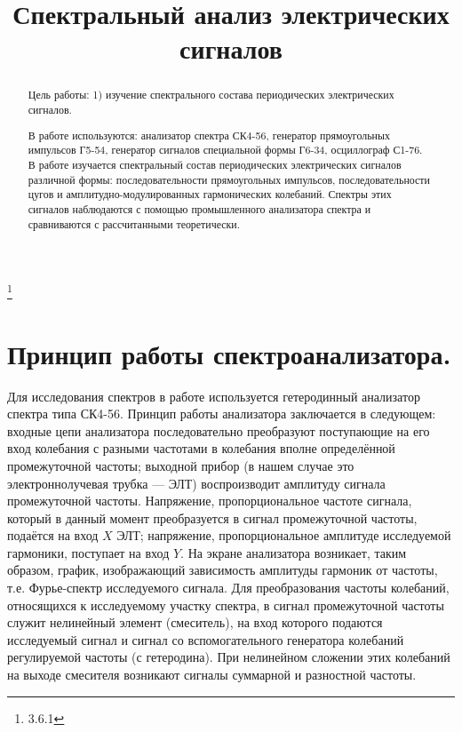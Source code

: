 


\title{Спектральный анализ электрических сигналов}
\thanks{3.6.1}



\begin{abstract}
Цель работы: 1) изучение спектрального состава периодических электрических сигналов.

В работе используются: анализатор спектра СК4-56, генератор прямоугольных импульсов Г5-54, генератор сигналов специальной формы Г6-34, осциллограф С1-76.\\

В работе изучается спектральный состав периодических электрических сигналов различной формы: последовательности прямоугольных
импульсов, последовательности цугов и амплитудно-модулированных гармонических колебаний. Спектры этих сигналов наблюдаются с помощью
промышленного анализатора спектра и сравниваются с рассчитанными теоретически.


\end{abstract}

\maketitle


\section{\label{sec:level1}Принцип работы спектроанализатора.}

Для исследования спектров в работе используется гетеродинный анализатор спектра типа СК4-56. 
Принцип работы анализатора заключается в следующем: входные цепи 
анализатора последовательно преобразуют поступающие на его вход колебания с разными частотами в колебания вполне определённой промежуточной частоты; выходной прибор (в нашем случае это электроннолучевая трубка — ЭЛТ) воспроизводит амплитуду сигнала промежуточной частоты. Напряжение, пропорциональное частоте сигнала, который в данный момент преобразуется в сигнал промежуточной частоты, подаётся на вход $X$ ЭЛТ; напряжение, пропорциональное амплитуде исследуемой гармоники, поступает на вход $Y$. На экране анализатора возникает, таким образом, график, изображающий зависимость амплитуды гармоник от частоты, т.е. Фурье-спектр исследуемого сигнала. Для преобразования частоты колебаний, относящихся к исследуемому участку спектра, в сигнал промежуточной частоты служит нелинейный элемент (смеситель), на вход которого подаются исследуемый сигнал и сигнал со вспомогательного генератора колебаний регулируемой
частоты (с гетеродина). При нелинейном сложении этих колебаний на
выходе смесителя возникают сигналы суммарной и разностной частоты.

